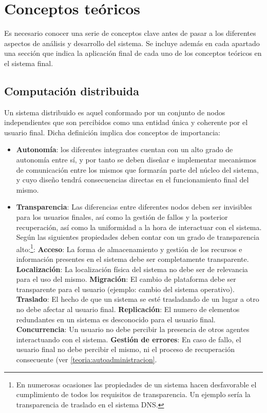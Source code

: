 \chapter{Conceptos teóricos}

Es necesario conocer una serie de conceptos clave antes de pasar a los diferentes aspectos de análisis y desarrollo del sistema. Se incluye además en cada apartado una sección que indica la aplicación final de cada uno de los conceptos teóricos en el sistema final.

\section{Computación distribuida}

Un sistema distribuido es aquel conformado por un conjunto de nodos independientes que son percibidos como una entidad única y coherente por el usuario final. Dicha definición implica dos conceptos de importancia:

\begin{itemize}
  \item \textbf{Autonomía}: los diferentes integrantes cuentan con un alto grado de autonomía entre sí, y por tanto se deben diseñar e implementar mecanismos de comunicación entre los mismos que formarán parte del núcleo del sistema, y cuyo diseño tendrá consecuencias directas en el funcionamiento final del mismo.
  \item \textbf{Transparencia}: Las diferencias entre diferentes nodos deben ser invisibles para los usuarios finales, así como la gestión de fallos y la posterior recuperación, así como la uniformidad a la hora de interactuar con el sistema. Según \citationneeded las siguientes propiedades deben contar con un grado de transparencia alto:\footnote{En numerosas ocasiones las propiedades de un sistema hacen desfavorable el cumplimiento de todos los requisitos de transparencia. Un ejemplo sería la transparencia de traslado en el sistema DNS.}:
\label{transparencia}
  \subitem \textbf{Acceso}: La forma de almacenamiento y gestión de los recursos e información presentes en el sistema debe ser completamente transparente.
  \subitem \textbf{Localización}: La localización física del sistema no debe ser de relevancia para el uso del mismo.
  \subitem \textbf{Migración}: El cambio de plataforma debe ser transparente para el usuario (ejemplo: cambio del sistema operativo).
  \subitem \textbf{Traslado}: El hecho de que un sistema se esté trasladando de un lugar a otro no debe afectar al usuario final.
  \subitem \textbf{Replicación}: El numero de elementos redundantes en un sistema es desconocido para el usuario final.
  \subitem \textbf{Concurrencia}: Un usuario no debe percibir la presencia de otros agentes interactuando con el sistema.
  \subitem \textbf{Gestión de errores}: En caso de fallo, el usuario final no debe percibir el mismo, ni el proceso de recuperación consecuente (ver \ref{teoria:autoadministracion}.
\end{itemize}

